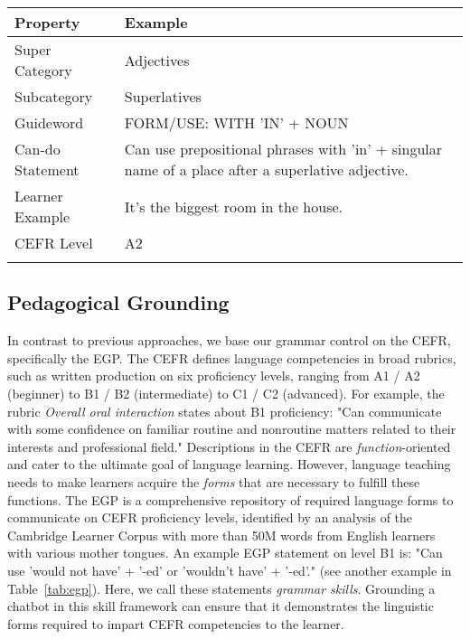 \begin{table*}[ht]
\centering
\small
\begin{tabular}{lp{12cm}}
\hline
\textbf{Property}        & \textbf{Example}                                    \\ \hline

Super Category           & Adjectives  \\ 
Subcategory              & Superlatives \\ 
Guideword & FORM/USE: WITH 'IN' + NOUN \\
Can-do Statement         & Can use prepositional phrases with 'in' + singular name of a place after a superlative adjective.   \\
Learner Example         & It's the biggest room in the house.  \\
CEFR Level               & A2   \\ \hline
\normalsize
\end{tabular}
\caption{An example from the 1,222 grammar skills in the English Grammar Profile, which lists the skills used in the two grammar control tasks.}
\label{tab:egp}
\end{table*}

\subsection{Pedagogical Grounding}
In contrast to previous approaches, we base our grammar control on the CEFR, specifically the EGP. The CEFR defines language competencies in broad rubrics, such as written production on six proficiency levels, ranging from A1 / A2 (beginner) to B1 / B2 (intermediate) to C1 / C2 (advanced). For example, the rubric \textit{Overall oral interaction} states about B1 proficiency: "Can communicate with some confidence on familiar routine and nonroutine matters related to their interests and professional field." Descriptions in the CEFR are \textit{function}-oriented and cater to the ultimate goal of language learning. However, language teaching needs to make learners acquire the \textit{forms} that are necessary to fulfill these functions. The EGP is a comprehensive repository of required language forms to communicate on CEFR proficiency levels, identified by an analysis of the Cambridge Learner Corpus with more than 50M words from English learners with various mother tongues. An example EGP statement on level B1 is: "Can use 'would not have' + '-ed' or 'wouldn’t have' + '-ed'." (see another example in Table~\ref{tab:egp}). Here, we call these statements \textit{grammar skills}. Grounding a chatbot in this skill framework can ensure that it demonstrates the linguistic forms required to impart CEFR competencies to the learner.

